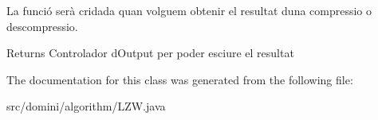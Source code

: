 La funció serà cridada quan volguem obtenir el resultat d\textquotesingle{}una compressio o descompressio. 

\begin{DoxyReturn}{Returns}
Controlador d\textquotesingle{}Output per poder esciure el resultat 
\end{DoxyReturn}


The documentation for this class was generated from the following file\+:\begin{DoxyCompactItemize}
\item 
src/domini/algorithm/L\+Z\+W.\+java\end{DoxyCompactItemize}
